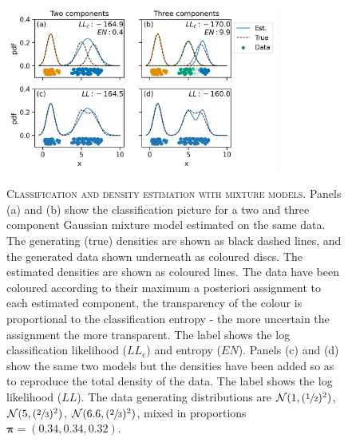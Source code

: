 \begin{figure}
    \centering
    \caption[Classification and density estimation with mixture models]{\textsc{Classification and density estimation with mixture models}. Panels (a) and (b) show the classification picture for a two and three component Gaussian mixture model estimated on the same data. The generating (true) densities are shown as black dashed lines, and the generated data shown underneath as coloured discs. The estimated densities are shown as coloured lines. The data have been coloured according to their maximum a posteriori assignment to each estimated component, the transparency of the colour is proportional to the classification entropy - the more uncertain the assignment the more transparent. The label shows the log classification likelihood ($LL_{\mathrm{c}}$) and entropy ($EN$). Panels (c) and (d) show the same two models but the densities have been added so as to reproduce the total density of the data. The label shows the log likelihood ($LL$). The data generating distributions are $\mathcal{N}(1, (\sfrac{1}{2})^{2})$, $\mathcal{N}(5, (\sfrac{2}{3})^{2})$, $\mathcal{N}(6.6, (\sfrac{2}{3})^{2})$, mixed in proportions $\bm{\pi}=(0.34, 0.34, 0.32)$.}
    \includegraphics[width=0.8\textwidth]{chapters/hmm_selection/figures/class_like_explainer.png}
    \label{fig:hmm_class_lik_explainer}
\end{figure}

